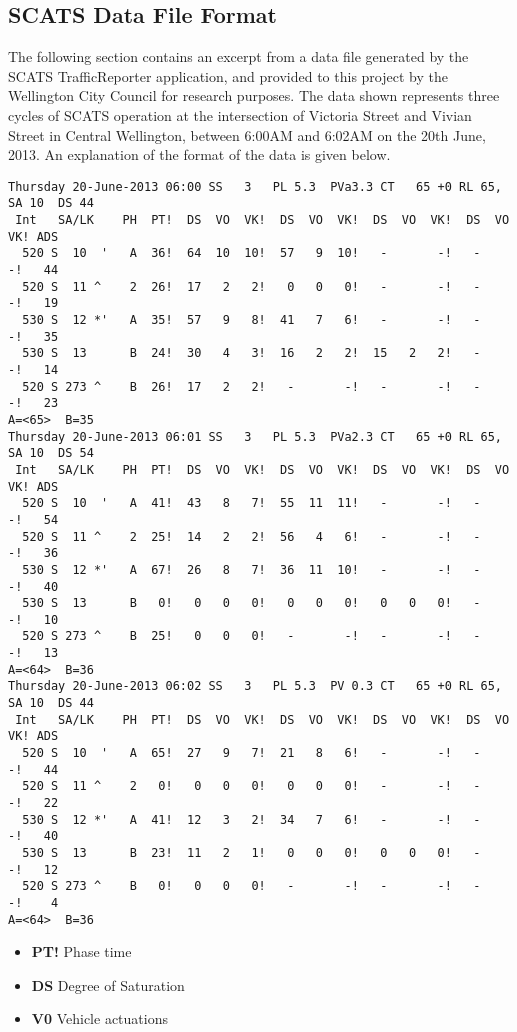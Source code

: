 \begin{appendices}

\chapter{SCATS Data File Format}

The following section contains an excerpt from a data file generated by the SCATS TrafficReporter application, and provided to this project by the Wellington City Council for research purposes. The data shown represents three cycles of SCATS operation at the intersection of Victoria Street and Vivian Street in Central Wellington, between 6:00AM and 6:02AM on the 20th June, 2013. An explanation of the format of the data is given below.

\begin{verbatim}
Thursday 20-June-2013 06:00 SS   3   PL 5.3  PVa3.3 CT   65 +0 RL 65, SA 10  DS 44
 Int   SA/LK    PH  PT!  DS  VO  VK!  DS  VO  VK!  DS  VO  VK!  DS  VO  VK! ADS
  520 S  10  '   A  36!  64  10  10!  57   9  10!   -       -!   -       -!   44
  520 S  11 ^    2  26!  17   2   2!   0   0   0!   -       -!   -       -!   19
  530 S  12 *'   A  35!  57   9   8!  41   7   6!   -       -!   -       -!   35
  530 S  13      B  24!  30   4   3!  16   2   2!  15   2   2!   -       -!   14
  520 S 273 ^    B  26!  17   2   2!   -       -!   -       -!   -       -!   23
A=<65>  B=35
Thursday 20-June-2013 06:01 SS   3   PL 5.3  PVa2.3 CT   65 +0 RL 65, SA 10  DS 54
 Int   SA/LK    PH  PT!  DS  VO  VK!  DS  VO  VK!  DS  VO  VK!  DS  VO  VK! ADS
  520 S  10  '   A  41!  43   8   7!  55  11  11!   -       -!   -       -!   54
  520 S  11 ^    2  25!  14   2   2!  56   4   6!   -       -!   -       -!   36
  530 S  12 *'   A  67!  26   8   7!  36  11  10!   -       -!   -       -!   40
  530 S  13      B   0!   0   0   0!   0   0   0!   0   0   0!   -       -!   10
  520 S 273 ^    B  25!   0   0   0!   -       -!   -       -!   -       -!   13
A=<64>  B=36
Thursday 20-June-2013 06:02 SS   3   PL 5.3  PV 0.3 CT   65 +0 RL 65, SA 10  DS 44
 Int   SA/LK    PH  PT!  DS  VO  VK!  DS  VO  VK!  DS  VO  VK!  DS  VO  VK! ADS
  520 S  10  '   A  65!  27   9   7!  21   8   6!   -       -!   -       -!   44
  520 S  11 ^    2   0!   0   0   0!   0   0   0!   -       -!   -       -!   22
  530 S  12 *'   A  41!  12   3   2!  34   7   6!   -       -!   -       -!   40
  530 S  13      B  23!  11   2   1!   0   0   0!   0   0   0!   -       -!   12
  520 S 273 ^    B   0!   0   0   0!   -       -!   -       -!   -       -!    4
A=<64>  B=36
\end{verbatim}

\begin{itemize}
\item \textbf{PT!} Phase time
\item \textbf{DS} Degree of Saturation
\item \textbf{V0} Vehicle actuations
\end{itemize}

\end{appendices}
